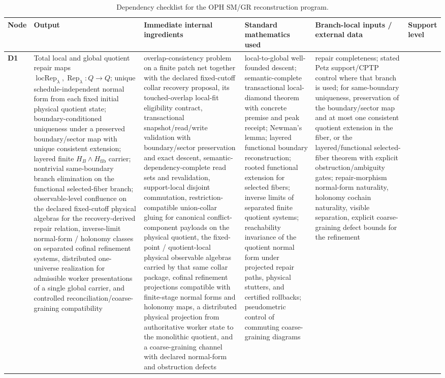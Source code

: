 \documentclass[11pt]{article}
\begin{document}
\begingroup
\tiny
\setlength{\tabcolsep}{1pt}
\begin{longtable}{@{}>{\raggedright\arraybackslash}p{}>{\raggedright\arraybackslash}p{}>{\raggedright\arraybackslash}p{}>{\raggedright\arraybackslash}p{}>{\raggedright\arraybackslash}p{}>{\raggedright\arraybackslash}p{}@{}}
\caption{Dependency checklist for the OPH SM/GR reconstruction program.}\\
\toprule
Node & Output & Immediate internal ingredients & Standard mathematics used & Branch-local inputs / external data & Support level \\
\midrule
\endhead
\bottomrule
\endfoot
\textbf{D1} & Total local and global quotient repair maps \(\operatorname{locRep}_\lambda,\operatorname{Rep}_\lambda:Q\to Q\); unique schedule-independent normal form from each fixed initial physical quotient state; boundary-conditioned uniqueness under a preserved boundary/sector map with unique consistent extension; layered finite \(H_B\wedge H_{\mathrm{fib}}\) carrier; nontrivial same-boundary branch elimination on the functional selected-fiber branch; observable-level confluence on the declared fixed-cutoff physical algebras for the recovery-derived repair relation, inverse-limit normal-form / holonomy classes on separated cofinal refinement systems, distributed one-universe realization for admissible worker presentations of a single global carrier, and controlled reconciliation/coarse-graining compatibility & overlap-consistency problem on a finite patch net together with the declared fixed-cutoff collar recovery proposal, its touched-overlap local-fit eligibility contract, transactional snapshot/read/write validation with boundary/sector preservation and exact descent, semantic-dependency-complete read sets and revalidation, support-local disjoint commutation, restriction-compatible union-collar gluing for canonical conflict-component payloads on the physical quotient, the fixed-point / quotient-local physical observable algebras carried by that same collar package, cofinal refinement projections compatible with finite-stage normal forms and holonomy maps, a distributed physical projection from authoritative worker state to the monolithic quotient, and a coarse-graining channel with declared normal-form and obstruction defects & local-to-global well-founded descent; semantic-complete transactional local-diamond theorem with concrete premise and peak receipt; Newman's lemma; layered functional boundary reconstruction; rooted functional extension for selected fibers; inverse limits of separated finite quotient systems; reachability invariance of the quotient normal form under projected repair paths, physical stutters, and certified rollbacks; pseudometric control of commuting coarse-graining diagrams & repair completeness; stated Petz support/CPTP control where that branch is used; for same-boundary uniqueness, preservation of the boundary/sector map and at most one consistent quotient extension in the fiber, or the layered/functional selected-fiber theorem with explicit obstruction/ambiguity gates; repair-morphism normal-form naturality, holonomy cochain naturality, visible separation, explicit coarse-graining defect bounds for the refinement 
\end{longtable}
\end{document}
